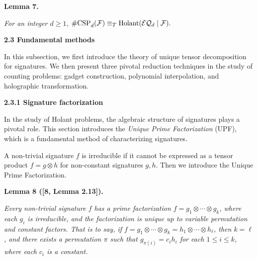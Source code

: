\par\medskip\noindent\textbf{
\textbf{Lemma 7}\textbf{.}
}\par



\emph{For an integer $d\geq 1$, $\textup{{\#CSP}}_{d}(\mathcal{F})\equiv_{T}\textup{{Holant}}(\mathcal{EQ}_{d}\mid\mathcal{F}).$}\par







\par\medskip\noindent\textbf{
2.3 Fundamental methods}\par




In this subsection, we first introduce the theory of unique tensor decomposition for signatures. We then present three pivotal reduction techniques in the study of counting problems: gadget construction, polynomial interpolation, and holographic transformation.\par




\par\medskip\noindent\textbf{
2.3.1 Signature factorization}\par




In the study of Holant problems, the algebraic structure of signatures plays a pivotal role. This section introduces the \emph{Unique Prime Factorization} (UPF), which is a fundamental method of characterizing signatures.\par




A non-trivial signature $f$ is irreducible if it cannot be expressed as a tensor product $f=g\otimes h$ for non-constant signatures $g,h$. Then we introduce the Unique Prime Factorization.\par





\par\medskip\noindent\textbf{
\textbf{Lemma 8}\textbf{ }([8, Lemma 2.13])\textbf{.}
}\par



\emph{Every non-trivial signature $f$ has a prime factorization $f=g_{1}\otimes\cdots\otimes g_{k}$, where each $g_{i}$ is irreducible, and the factorization is unique up to variable permutation and constant factors. That is to say, if $f=g_{1}\otimes\cdots\otimes g_{k}=h_{1}\otimes\cdots\otimes h_{\ell}$, then $k=\ell$, and there exists a permutation $\pi$ such that $g_{\pi(i)}=c_{i}h_{i}$ for each $1\leq i\leq k$, where each $c_{i}$ is a constant.}\par



